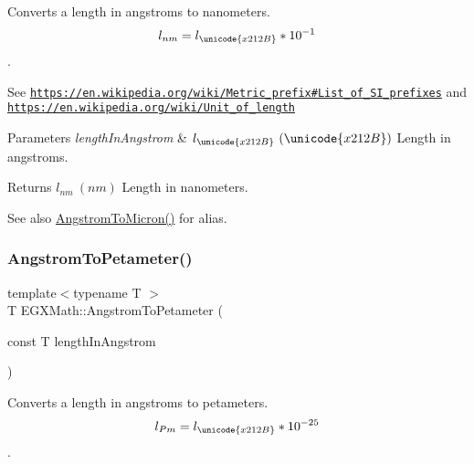 Converts a length in angstroms to nanometers. \[ l_{nm}=l_{\unicode{x212B}} * 10^{-1} \]. 

See \href{https://en.wikipedia.org/wiki/Metric_prefix#List_of_SI_prefixes}{\tt https\+://en.\+wikipedia.\+org/wiki/\+Metric\+\_\+prefix\#\+List\+\_\+of\+\_\+\+S\+I\+\_\+prefixes} and \href{https://en.wikipedia.org/wiki/Unit_of_length}{\tt https\+://en.\+wikipedia.\+org/wiki/\+Unit\+\_\+of\+\_\+length} 
\begin{DoxyParams}{Parameters}
{\em length\+In\+Angstrom} & $ l_{\unicode{x212B}}\ (\unicode{x212B})$ Length in angstroms. \\
\hline
\end{DoxyParams}
\begin{DoxyReturn}{Returns}
$ l_{nm}\ (nm)$ Length in nanometers. 
\end{DoxyReturn}
\begin{DoxySeeAlso}{See also}
\mbox{\hyperlink{group___e_g_x_math-_conversions-_length_conversions-_non-_s_i-_angstrom-_non-_s_i_ga097787c82296d2767637cd15101ec272}{Angstrom\+To\+Micron()}} for alias. 
\end{DoxySeeAlso}
\mbox{\label{group___e_g_x_math-_conversions-_length_conversions-_non-_s_i-_angstrom-_s_i_gafef0064a5934d807bed8bc6e8c9dd048}} 
\subsubsection{\texorpdfstring{Angstrom\+To\+Petameter()}{AngstromToPetameter()}}
{\footnotesize\ttfamily template$<$typename T $>$ \\
T E\+G\+X\+Math\+::\+Angstrom\+To\+Petameter (\begin{DoxyParamCaption}\item[{const T}]{length\+In\+Angstrom }\end{DoxyParamCaption})}



Converts a length in angstroms to petameters. \[ l_{Pm}=l_{\unicode{x212B}} * 10^{-25} \]. 

